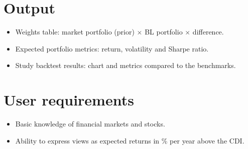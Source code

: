 \section{Output}
\begin{itemize}
  \item Weights table: market portfolio (prior) $\times$ BL portfolio $\times$ difference.
  \item Expected portfolio metrics: return, volatility and Sharpe ratio.
  \item Study backtest results: chart and metrics compared to the benchmarks.
\end{itemize}

\section{User requirements}
\begin{itemize}
  \item Basic knowledge of financial markets and stocks.
  \item Ability to express views as expected returns in \% per year above the CDI.
\end{itemize}
